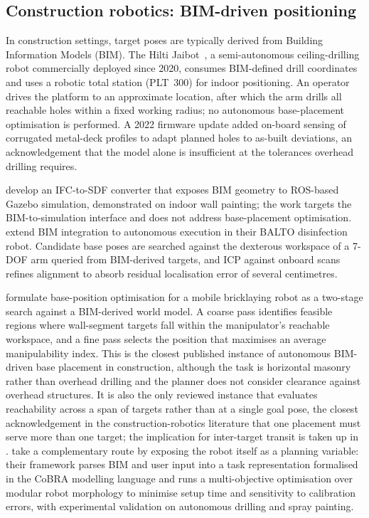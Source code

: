 \documentclass[11pt,a4paper]{article}
\begin{document}
\subsection{Construction robotics: BIM-driven positioning}

In construction settings, target poses are typically derived from Building Information Models (BIM). The Hilti Jaibot~\citep{hilti2020jaibot}, a semi-autonomous ceiling-drilling robot commercially deployed since 2020, consumes BIM-defined drill coordinates and uses a robotic total station (PLT~300) for indoor positioning. An operator drives the platform to an approximate location, after which the arm drills all reachable holes within a fixed working radius; no autonomous base-placement optimisation is performed. A 2022 firmware update added on-board sensing of corrugated metal-deck profiles to adapt planned holes to as-built deviations, an acknowledgement that the model alone is insufficient at the tolerances overhead drilling requires.

\citet{kimDevelopmentBIMintegratedConstruction2021} develop an IFC-to-SDF converter that exposes BIM geometry to ROS-based Gazebo simulation, demonstrated on indoor wall painting; the work targets the BIM-to-simulation interface and does not address base-placement optimisation. \citet{giustiBALTOBIMIntegratedMobile2021} extend BIM integration to autonomous execution in their BALTO disinfection robot. Candidate base poses are searched against the dexterous workspace of a 7-DOF arm queried from BIM-derived targets, and ICP against onboard scans refines alignment to absorb residual localisation error of several centimetres.

\citet{zhu2025bricklaying} formulate base-position optimisation for a mobile bricklaying robot as a two-stage search against a BIM-derived world model. A coarse pass identifies feasible regions where wall-segment targets fall within the manipulator's reachable workspace, and a fine pass selects the position that maximises an average manipulability index. This is the closest published instance of autonomous BIM-driven base placement in construction, although the task is horizontal masonry rather than overhead drilling and the planner does not consider clearance against overhead structures. It is also the only reviewed instance that evaluates reachability across a span of targets rather than at a single goal pose, the closest acknowledgement in the construction-robotics literature that one placement must serve more than one target; the implication for inter-target transit is taken up in . \citet{kulzHolisticConstructionAutomation2025} take a complementary route by exposing the robot itself as a planning variable: their framework parses BIM and user input into a task representation formalised in the CoBRA modelling language and runs a multi-objective optimisation over modular robot morphology to minimise setup time and sensitivity to calibration errors, with experimental validation on autonomous drilling and spray painting.
\end{document}
